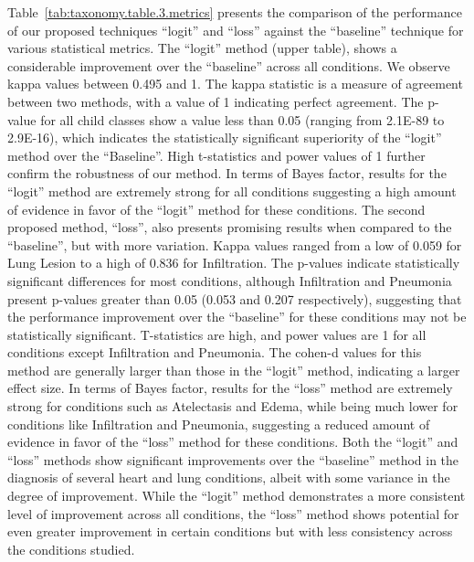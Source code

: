 Table~\ref{tab:taxonomy.table.3.metrics} presents the comparison of the performance of our proposed techniques ``logit'' and ``loss'' against the ``baseline'' technique for various statistical metrics. The ``logit'' method (upper table), shows a considerable improvement over the ``baseline'' across all conditions. We observe kappa values between 0.495 and 1. The kappa statistic is a measure of agreement between two methods, with a value of 1 indicating perfect agreement. The p-value for all child classes show a value less than 0.05 (ranging from 2.1E-89 to 2.9E-16), which indicates the statistically significant superiority of the ``logit'' method over the ``Baseline''. High t-statistics and power values of 1 further confirm the robustness of our method. In terms of Bayes factor, results for the ``logit'' method are extremely strong for all conditions suggesting a high amount of evidence in favor of the ``logit'' method for these conditions. The second proposed method, ``loss'', also presents promising results when compared to the ``baseline'', but with more variation. Kappa values ranged from a low of 0.059 for Lung Lesion to a high of 0.836 for Infiltration. The p-values indicate statistically significant differences for most conditions, although Infiltration and Pneumonia present p-values greater than 0.05 (0.053 and 0.207 respectively), suggesting that the performance improvement over the ``baseline'' for these conditions may not be statistically significant. T-statistics are high, and power values are 1 for all conditions except Infiltration and Pneumonia. The cohen-d values for this method are generally larger than those in the ``logit'' method, indicating a larger effect size. In terms of Bayes factor, results for the ``loss'' method are extremely strong for conditions such as Atelectasis and Edema, while being much lower for conditions like Infiltration and Pneumonia, suggesting a reduced amount of evidence in favor of the ``loss'' method for these conditions. Both the ``logit'' and ``loss'' methods show significant improvements over the ``baseline'' method in the diagnosis of several heart and lung conditions, albeit with some variance in the degree of improvement. While the ``logit'' method demonstrates a more consistent level of improvement across all conditions, the ``loss'' method shows potential for even greater improvement in certain conditions but with less consistency across the conditions studied.
